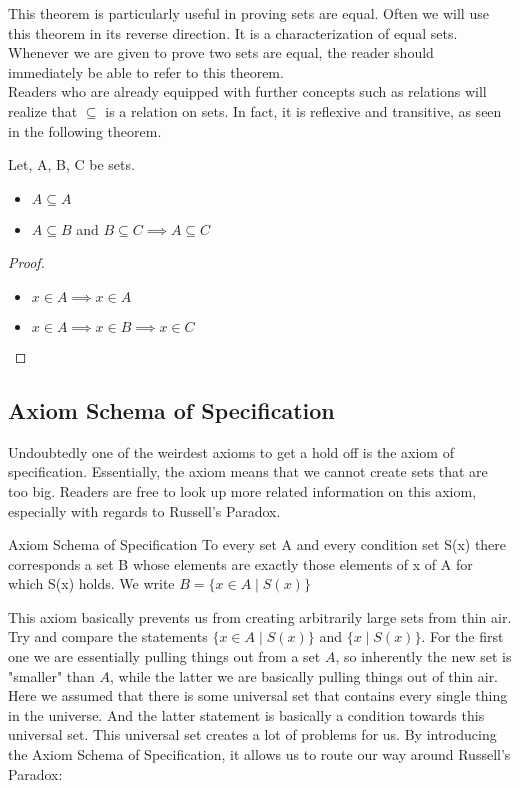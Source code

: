 \documentclass[a4paper]{article}
\begin{document}
This theorem is particularly useful in proving sets are equal. Often we will use this theorem in its reverse direction. It is a characterization of equal sets. Whenever we are given to prove two sets are equal, the reader should immediately be able to refer to this theorem. \\
Readers who are already equipped with further concepts such as relations will realize that $\subseteq$ is a relation on sets. In fact, it is reflexive and transitive, as seen in the following theorem. 
\begin{thm}{}{} Let, A, B, C be sets. 
\begin{itemize}
\item $A\subseteq A$
\item $A\subseteq B$ and $B\subseteq C\implies A\subseteq C$
\end{itemize}
\begin{proof}~\\
\begin{itemize}
\item $x\in A\implies x\in A$
\item $x\in A\implies x\in B\implies x\in C$
\end{itemize}
\end{proof}
\end{thm}

\subsection{Axiom Schema of Specification}
Undoubtedly one of the weirdest axioms to get a hold off is the axiom of specification. Essentially, the axiom means that we cannot create sets that are too big. Readers are free to look up more related information on this axiom, especially with regards to Russell's Paradox. 

\begin{axm}{Axiom Schema of Specification}{} To every set A and every condition set S(x) there corresponds a set B whose elements are exactly those elements of x of A for which S(x) holds. We write $B=\{x\in A\;|\;S(x)\}$
\end{axm}

This axiom basically prevents us from creating arbitrarily large sets from thin air. Try and compare the statements $\{x\in A\;|\;S(x)\}$ and $\{x\;|\;S(x)\}$. For the first one we are essentially pulling things out from a set $A$, so inherently the new set is "smaller" than $A$, while the latter we are basically pulling things out of thin air. Here we assumed that there is some universal set that contains every single thing in the universe. And the latter statement is basically a condition towards this universal set. This universal set creates a lot of problems for us. By introducing the Axiom Schema of Specification, it allows us to route our way around Russell's Paradox:\\
\end{document}
